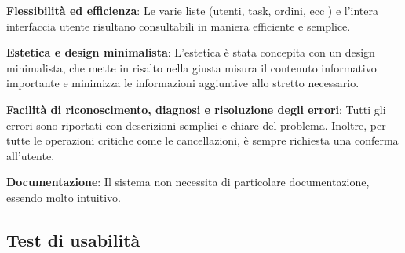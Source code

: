 \textbf{Flessibilità ed efficienza}: Le varie liste (utenti, task, ordini, ecc ) e l'intera interfaccia utente risultano consultabili in maniera efficiente e semplice.

\textbf{Estetica e design minimalista}: L’estetica è stata concepita con un design minimalista, che mette in risalto nella giusta misura il contenuto informativo importante e minimizza le informazioni aggiuntive allo stretto necessario.

\textbf{Facilità di riconoscimento, diagnosi e risoluzione degli errori}: Tutti gli errori sono riportati con descrizioni semplici e chiare del problema. Inoltre, per tutte le operazioni critiche come le cancellazioni, è sempre richiesta una conferma all’utente.

\textbf{Documentazione}: Il sistema non necessita di particolare documentazione, essendo molto intuitivo.


\subsection{Test di usabilità}